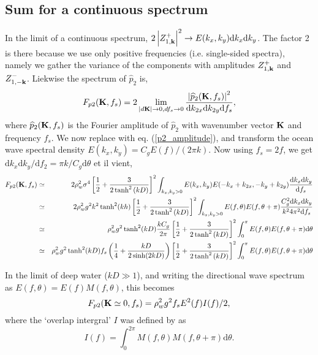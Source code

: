 \subsection{Sum for a continuous spectrum}
In the limit of a continuous spectrum, $2 \left|Z_{1,\mathbf{k}}^{+}\right|^2 \rightarrow E(k_x,k_y) \mathrm{d}k_x \mathrm{d}k_y$. The factor 2 is there 
because we use only positive frequencies (i.e. single-sided spectra), namely we gather the variance of the components with amplitudes $Z_{1,\mathbf{k}}^{+}$ and $Z_{1,-\mathbf{k}}^{-}$. 
Liekwise the spectrum of  $\widehat{p}_{2}$ is, 
\begin{equation}
F_{p2}(\mathbf{K},f_s) = 2 \lim_{\left|d \mathbf{K}\right| \rightarrow 0, df_s \rightarrow 0} \frac{\left|\widehat{p}_{2}(\mathbf{K},f_s) \right|^2}
{\mathrm{d}k_{2x} \mathrm{d}k_{2y} \mathrm{d} f_s}, 
\end{equation}
where $\widehat{p}_{2}(\mathbf{K},f_s)$ is the Fourier amplitude of  $\widehat{p}_{2}$ with wavenumber vector  $\mathbf{K}$  and frequency  $f_s$. 
We now replace with eq. (\ref{p2_amplitude}), and transform the ocean wave spectral density  $E(k_x,k_y)={ C_g} E(f)/({2 \pi k})$. Now using  $f_s = 2 f$, we get 
$\mathrm{d}k_x \mathrm{d}k_y /\mathrm{d} f_2= {\pi k}/C_g \mathrm{d} \theta$ et il vient, 
\begin{eqnarray}
     F_{p2}(\mathbf{K},f_s)  &\simeq & 2 \rho_w^2 \sigma^4 \left[\frac{1}{2} + \frac{3}{2\tanh^2 \left(k D \right)} \right]^2 
     \int_{k_x,k_y > 0} E(k_x,k_y) E(-k_x+k_{2x},-k_y+k_{2y}) \frac{\mathrm{d}k_x \mathrm{d}k_y }{\mathrm{d} f_s}  \\
  &\simeq & 2 \rho_w^2 g^2 k^2 \tanh^2(kh)  \left[\frac{1}{2} + \frac{3}{2\tanh^2 \left(k D \right)} \right]^2 
     \int_{k_x,k_y > 0} E(f,\theta) E(f,\theta+\pi) \frac{C_g^2 \mathrm{d}k_x \mathrm{d}k_y }{k^2 4 \pi^2 \mathrm{d} f_s}  \\
&\simeq & \rho_w^2 g^2 \tanh^2(kD) \frac{k C_g }{ 2 \pi}  \left[\frac{1}{2} + \frac{3}{2\tanh^2 \left(k D \right)} \right]^2 
     \int_{0}^{\pi}  E(f,\theta) E(f,\theta+\pi)  \mathrm{d} \theta  \\
&\simeq & \rho_w^2 g^2 \tanh^2(kD) f_s \left(\frac{1}{4}+\frac{kD}{2 \sinh(2kD)} \right) \left[\frac{1}{2} + \frac{3}{2\tanh^2 \left(k D \right)} \right]^2 
     \int_{0}^{\pi}  E(f,\theta) E(f,\theta+\pi)  \mathrm{d} \theta  \nonumber\\
\label{p2_spectrum}
\end{eqnarray}

In the limit of deep water ($kD \gg 1$), and writing the directional wave spectrum as $E(f,\theta)=E(f) M(f,\theta) $, this becomes
\begin{equation}
F_{p2}(\mathbf{K} \simeq 0,f_s)=\rho_w^2 g^2  f_s   E^2(f)I(f)/2,
\end{equation}
where the `overlap intergral' $I$ was defined by \cite{Farrell&Munk2008} as 
\begin{equation}
I(f)=\int_{0}^{2 \pi}M(f,\theta)M(f,\theta+\pi)\mathrm{d}\theta.\label{eq:I}
\end{equation}

